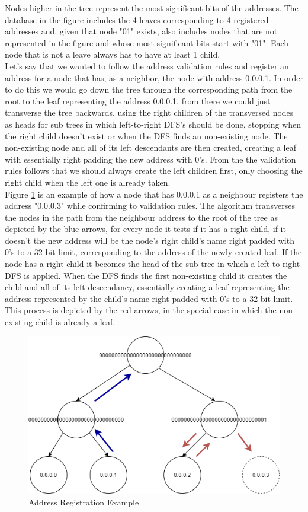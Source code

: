 Nodes higher in the tree represent the most significant bits of the addresses. The database in the figure includes the 4 leaves corresponding to 4 registered addresses and, given that node "01" exists, also includes nodes that are not represented in the figure and whose most significant bits start with "01". Each node that is not a leave always has to have at least 1 child. \\
Let's say that we wanted to follow the address validation rules and register an address for a node that has, as a neighbor, the node with address 0.0.0.1. In order to do this we would go down the tree through the corresponding path from the root to the leaf representing the address 0.0.0.1, from there we could just transverse the tree backwards, using the right children of the transversed nodes as heads for sub trees in which left-to-right DFS's should be done, stopping when the right child doesn't exist or when the DFS finds an non-existing node. The non-existing node and all of its left descendants are then created, creating a leaf with essentially right padding the new address with 0's. From the the validation rules follows that we should always create the left children first, only choosing the right child when the left one is already taken. \\
Figure \ref{fig:reg_addr_db_example} is an example of how a node that has 0.0.0.1 as a neighbour registers the address "0.0.0.3" while confirming to validation rules. The algorithm transverses the nodes in the path from the neighbour address to the root of the tree as depicted by the blue arrows, for every node it tests if it has a right child, if it doesn't the new address will be the node's right child's name right padded with 0's to a 32 bit limit, corresponding to the address of the newly created leaf. If the node has a right child it becomes the head of the sub-tree in which a left-to-right DFS is applied. When the DFS finds the first non-existing child it creates the child and all of its left descendancy, essentially creating a leaf representing the address represented by the child's name right padded with 0's to a 32 bit limit. This process is depicted by the red arrows, in the special case in which the non-existing child is already a leaf.

\begin{figure}[H]
\begin{center}
  \includegraphics[width=0.8\linewidth]{images/reg_addr_db_example.png}
  \caption{Address Registration Example}
  \label{fig:reg_addr_db_example}
  \end{center}
\end{figure}

